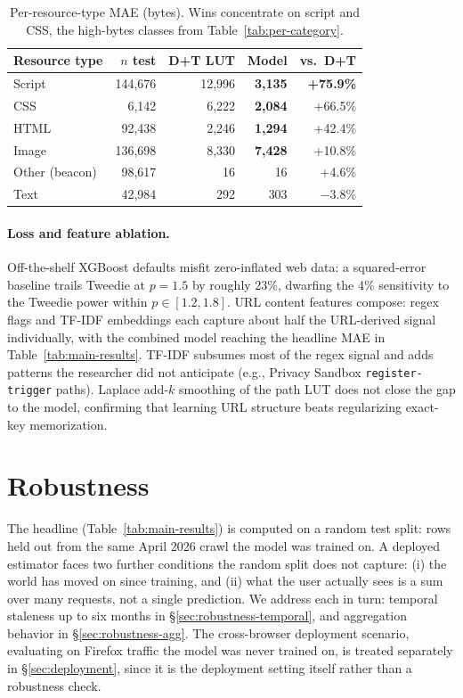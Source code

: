 \documentclass[10pt,sigconf,letterpaper,anonymous]{acmart}
\begin{document}
\begin{table}[H]
\centering
\small
\setlength{\tabcolsep}{4pt}
\begin{tabular}{lrrrr}
\toprule
Resource type & $n$ test & D+T LUT & Model & vs.\ D+T \\
\midrule
Script         & 144,676 & 12,996 & \textbf{3,135} & \textbf{+75.9\%} \\
CSS            &   6,142 &  6,222 & \textbf{2,084} & +66.5\% \\
HTML           &  92,438 &  2,246 & \textbf{1,294} & +42.4\% \\
Image          & 136,698 &  8,330 & \textbf{7,428} & +10.8\% \\
Other (beacon) &  98,617 &     16 &     16 & +4.6\% \\
Text           &  42,984 &    292 &    303 & $-$3.8\% \\
\bottomrule
\end{tabular}
\caption{Per-resource-type MAE (bytes). Wins concentrate on script and CSS, the high-bytes classes from Table~\ref{tab:per-category}.}
\label{tab:by-type}
\end{table}

\paragraph{Loss and feature ablation.}
Off-the-shelf XGBoost defaults misfit zero-inflated web data: a squared-error baseline trails Tweedie at $p{=}1.5$ by roughly 23\%, dwarfing the 4\% sensitivity to the Tweedie power within $p\in[1.2,1.8]$.
URL content features compose: regex flags and TF-IDF embeddings each capture about half the URL-derived signal individually, with the combined model reaching the headline MAE in Table~\ref{tab:main-results}.
TF-IDF subsumes most of the regex signal and adds patterns the researcher did not anticipate (e.g., Privacy Sandbox \texttt{register-trigger} paths).
Laplace add-$k$ smoothing of the path LUT does not close the gap to the model, confirming that learning URL structure beats regularizing exact-key memorization.

\section{Robustness}
\label{sec:robustness}

The headline (Table~\ref{tab:main-results}) is computed on a random test split: rows held out from the same April 2026 crawl the model was trained on. A deployed estimator faces two further conditions the random split does not capture: (i) the world has moved on since training, and (ii) what the user actually sees is a sum over many requests, not a single prediction. We address each in turn: temporal staleness up to six months in \S\ref{sec:robustness-temporal}, and aggregation behavior in \S\ref{sec:robustness-agg}. The cross-browser deployment scenario, evaluating on Firefox traffic the model was never trained on, is treated separately in \S\ref{sec:deployment}, since it is the deployment setting itself rather than a robustness check.
\end{document}
